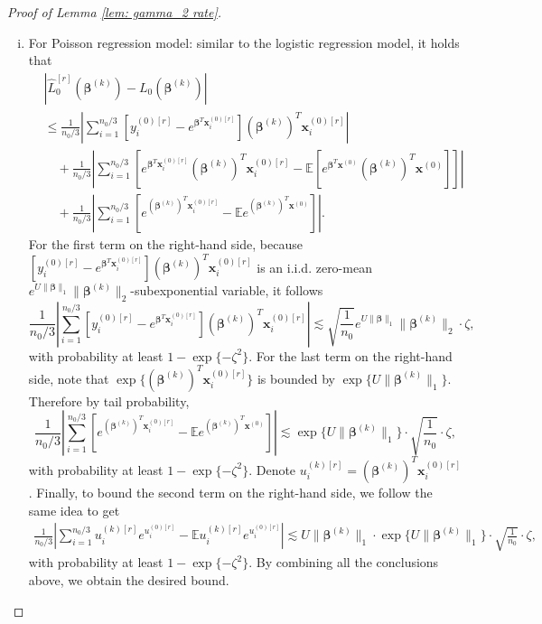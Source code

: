 \documentclass[12pt]{article}
\newcommand{\te}{\mathbb{E}}
\newcommand{\twonorm}[1]{\|#1\|_{2}}
\newcommand{\onenorm}[1]{\|#1\|_{1}}
\newcommand{\norma}[1]{\left|#1\right|}
\newcommand{\bbeta}{\bm{\beta}}
\newcommand{\bbetak}[1]{\bm{\beta}^{(#1)}}
\newcommand{\bx}{\bm{x}}
\newcommand{\bxk}[1]{\bm{x}^{(#1)}}
\newcommand{\bwk}[1]{\bm{w}^{(#1)}}
\newcommand{\<}{\langle}
\renewcommand{\>}{\rangle}
\begin{document}
\begin{proof}[Proof of Lemma \ref{lem: gamma_2 rate}]
\begin{enumerate}[(i)]
\begin{align}
			  &\lesssim \sqrt{\frac{1}{n_0}}\cdot \twonorm{\bbeta}\sup_k\twonorm{\bbetak{k}} \cdot \zeta \lesssim \sqrt{\frac{1}{n_0}}\cdot \twonorm{\bbeta}\sup_k\twonorm{\bwk{k}},
		\end{align}
		\begin{align}
			 \frac{1}{2n_0/3}\norma{\sum_{i=1}^{n_0/3}[(\bx^{(0)[r]}_i)^T\bbetak{k}]^2 - \te[(\bx^{(0)})^T\bbetak{k}]^2} &\lesssim \sqrt{\frac{1}{n_0}}\cdot \twonorm{\bbetak{k}}^2 \cdot \zeta,
		\end{align}
		with probability at least $1-\exp\{-\zeta^2\}$, which leads to the desired conclusion.
		\item For Poisson regression model: similar to the logistic regression model, it holds that
		\begin{align}
			&\norma{\hat{L}_0^{[r]}(\bbetak{k}) - L_0(\bbetak{k})} \\
			&\leq \frac{1}{n_0/3}\norma{\sum_{i=1}^{n_0/3} [y_i^{(0)[r]} - e^{\bbeta^T\bx_i^{(0)[r]}}](\bbetak{k})^T\bx_i^{(0)[r]}} \\
			&\quad + \frac{1}{n_0/3}\norma{\sum_{i=1}^{n_0/3}\left[e^{\bbeta^T\bx_i^{(0)[r]}}(\bbetak{k})^T\bx_i^{(0)[r]} - \te[e^{\bbeta^T\bxk{0}}(\bbetak{k})^T\bxk{0}]\right]} \\
			&\quad + \frac{1}{n_0/3}\norma{\sum_{i=1}^{n_0/3} \left[e^{(\bbetak{k})^T\bx_i^{(0)[r]}} - \te e^{(\bbetak{k})^T\bx^{(0)}} \right]}.
		\end{align}
		For the first term on the right-hand side, because $[y_i^{(0)[r]} - e^{\bbeta^T\bx_i^{(0)[r]}}](\bbetak{k})^T\bx_i^{(0)[r]}$ is an i.i.d. zero-mean $e^{U\onenorm{\bbeta}}\twonorm{\bbetak{k}}$-subexponential variable, it follows
		\begin{equation}
			\frac{1}{n_0/3}\norma{\sum_{i=1}^{n_0/3} [y_i^{(0)[r]} - e^{\bbeta^T\bx_i^{(0)[r]}}](\bbetak{k})^T\bx_i^{(0)[r]}}	 \lesssim \sqrt{\frac{1}{n_0}}e^{U\onenorm{\bbeta}}\twonorm{\bbetak{k}}\cdot \zeta,	
		\end{equation}
		with probability at least $1-\exp\{-\zeta^2\}$.
		For the last term on the right-hand side, note that $\exp\{(\bbetak{k})^T\bx_i^{(0)[r]}\}$ is bounded by $\exp\{U\onenorm{\bbetak{k}}\}$. Therefore by tail probability,
		\begin{equation}
			 \frac{1}{n_0/3}\norma{\sum_{i=1}^{n_0/3} \left[e^{(\bbetak{k})^T\bx_i^{(0)[r]}} - \te e^{(\bbetak{k})^T\bx^{(0)}} \right]} \lesssim  \exp\{U\onenorm{\bbetak{k}}\}\cdot \sqrt{\frac{1}{n_0}}\cdot \zeta,
		\end{equation}
		with probability at least $1-\exp\{-\zeta^2\}$. Denote $u_i^{(k)[r]} = (\bbetak{k})^T\bx^{(0)[r]}_i$.
		Finally, to bound the second term on the right-hand side, we follow the same idea to get
		\begin{align}
			\frac{1}{n_0/3}\norma{\sum_{i=1}^{n_0/3}u_i^{(k)[r]}e^{u_i^{(0)[r]}} - \te u_i^{(k)[r]}e^{u_i^{(0)[r]}}} \lesssim U\onenorm{\bbetak{k}} \cdot \exp\{U\onenorm{\bbetak{k}}\}\cdot \sqrt{\frac{1}{n_0}}\cdot \zeta,
		\end{align}
		with probability at least $1-\exp\{-\zeta^2\}$.
		By combining all the conclusions above, we obtain the desired bound.
		

\end{enumerate}
\end{proof}
\end{document}
